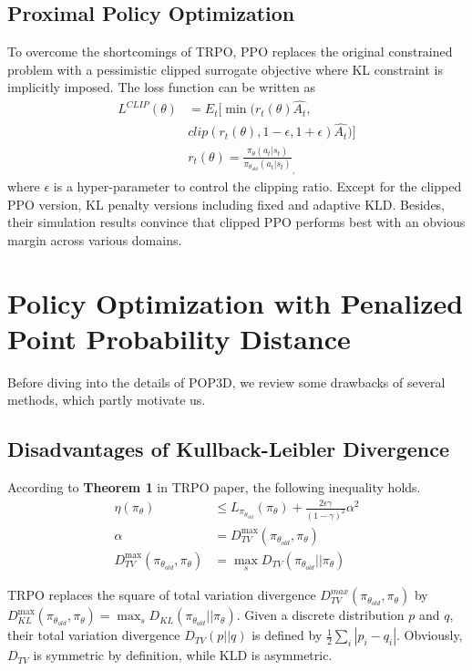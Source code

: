 \documentclass{article}
\begin{document}
\subsection{Proximal Policy Optimization}
To overcome the shortcomings of TRPO, PPO replaces the original constrained problem  with a pessimistic clipped surrogate objective where KL constraint is implicitly imposed. The loss function can be written as
\begin{equation}\label{ppo_eq}
\begin{split}
L^{CLIP}(\theta) & =  E_t[ \min(r_t(\theta)\hat{A_t}, \\
&clip(r_t(\theta), 1-\epsilon, 1+\epsilon)\hat{A_t})] \\
&r_t(\theta) = \frac{\pi_\theta(a_t|s_t)}{\pi_{\theta_{old}}(a_t|s_t)}_,
\end{split}
\end{equation}
where $\epsilon$ is a hyper-parameter to control the clipping ratio.
Except for the clipped PPO version, KL penalty versions including fixed and adaptive KLD.  Besides, their simulation results convince that clipped PPO performs best with an obvious margin across various domains.

\section{Policy Optimization with Penalized Point Probability Distance}
Before diving into the details of POP3D,  we review some drawbacks of several methods, which partly motivate us.

\subsection{Disadvantages of Kullback-Leibler Divergence}


According to \textbf{Theorem 1} in TRPO paper, the following inequality holds.
\begin{equation}
\begin{split}
\eta(\pi_\theta) & \le  L_{\pi_{\theta_{old}}}(\pi_\theta)+\frac{2\epsilon\gamma}{(1-\gamma)^2}\alpha^2\\
\alpha &= D_{TV}^{\max}(\pi_{\theta_{old}}, \pi_{\theta})\\
D_{TV}^{\max}(\pi_{\theta_{old}}, \pi_\theta) &= \max_s D_{TV}(\pi_{\theta_{old}}|| \pi_\theta)
\end{split}
\end{equation}

TRPO replaces the square of total variation divergence $D_{TV}^{max}(\pi_{\theta_{old}},\pi_{\theta})$ by $D_{KL}^{\max}(\pi_{\theta_{old}},\pi_\theta) = \max_s D_{KL}(\pi_{\theta_{old}}||\pi_{\theta})$. Given a discrete distribution $p$ and $q$, their total variation divergence $D_{TV}(p||q)$ is defined by $\frac{1}{2}\sum_i|p_i-q_i|$. Obviously, $D_{TV}$ is symmetric by definition, while KLD is  asymmetric.
\end{document}
